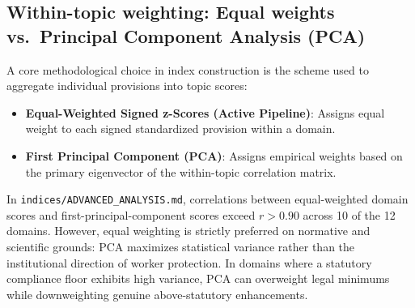 \subsection*{Within-topic weighting: Equal weights vs.\ Principal Component Analysis (PCA)}

A core methodological choice in index construction is the scheme used to aggregate individual provisions into topic scores:
\begin{itemize}
    \item \textbf{Equal-Weighted Signed z-Scores (Active Pipeline)}: Assigns equal weight to each signed standardized provision within a domain.
    \item \textbf{First Principal Component (PCA)}: Assigns empirical weights based on the primary eigenvector of the within-topic correlation matrix.
\end{itemize}
In \texttt{indices/ADVANCED\_ANALYSIS.md}, correlations between equal-weighted domain scores and first-principal-component scores exceed $r > 0.90$ across 10 of the 12 domains. However, equal weighting is strictly preferred on normative and scientific grounds: PCA maximizes statistical variance rather than the institutional direction of worker protection. In domains where a statutory compliance floor exhibits high variance, PCA can overweight legal minimums while downweighting genuine above-statutory enhancements.
